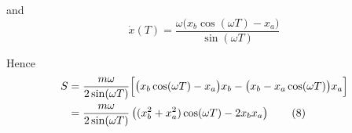 and
\begin{equation*}
\dot x(T)=\frac{\omega\bigl(x_b\cos(\omega T)-x_a\bigr)}{\sin(\omega T)}
\tag{7}
\end{equation*}

Hence
\begin{align*}
S&=\frac{m\omega}{2\sin(\omega T)}\Bigl[
\bigl(x_b\cos(\omega T)-x_a\bigr)x_b
-\bigl(x_b-x_a\cos(\omega T)\bigr)x_a
\Bigr]
\\
&=\frac{m\omega}{2\sin(\omega T)}
\left((x_b^2+x_a^2)\cos(\omega T)-2x_b x_a\right)
\tag{8}
\end{align*}


